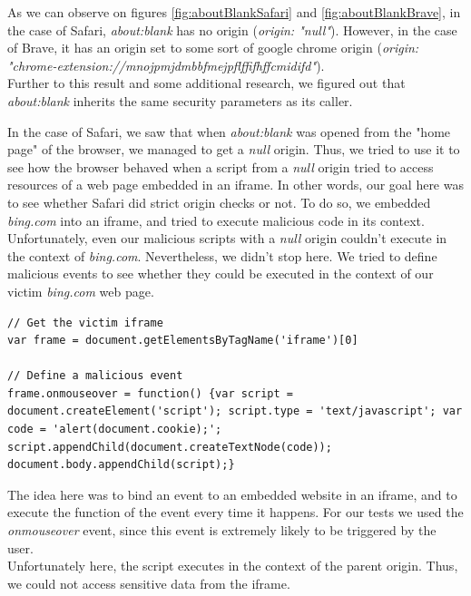 \documentclass[journal]{IEEEtran}
\begin{document}
As we can observe on figures \ref{fig:aboutBlankSafari} and \ref{fig:aboutBlankBrave}, in the case of Safari, \emph{about:blank} has no origin (\emph{origin: "null"}). However, in the case of Brave, it has an origin set to some sort of google chrome origin (\emph{origin: "chrome-extension://mnojpmjdmbbfmejpflffifhffcmidifd"}). \\

Further to this result and some additional research, we figured out that \emph{about:blank} inherits the same security parameters as its caller.

\medskip

In the case of Safari, we saw that when \emph{about:blank} was opened from the "home page" of the browser, we managed to get a \emph{null} origin. Thus, we tried to use it to see how the browser behaved when a script from a \emph{null} origin tried to access resources of a web page embedded in an iframe. In other words, our goal here was to see whether Safari did strict origin checks or not. To do so, we embedded \emph{bing.com} into an iframe, and tried to execute malicious code in its context.\\

Unfortunately, even our malicious scripts with a \emph{null} origin couldn't execute in the context of \emph{bing.com}. Nevertheless, we didn't stop here. We tried to define malicious events to see whether they could be executed in the context of our victim \emph{bing.com} web page.

\begin{lstlisting}[caption=Our attempt to define malicious event on an embbeded victim web page, label={listing:maliciousEvent}]
// Get the victim iframe
var frame = document.getElementsByTagName('iframe')[0]

// Define a malicious event
frame.onmouseover = function() {var script = document.createElement('script'); script.type = 'text/javascript'; var code = 'alert(document.cookie);'; script.appendChild(document.createTextNode(code)); document.body.appendChild(script);}
\end{lstlisting}

The idea here was to bind an event to an embedded website in an iframe, and to execute the function of the event every time it happens. For our tests we used the \emph{onmouseover} event, since this event is extremely likely to be triggered by the user. \\
Unfortunately here, the script executes in the context of the parent origin. Thus, we could not access sensitive data from the iframe.
\end{document}
